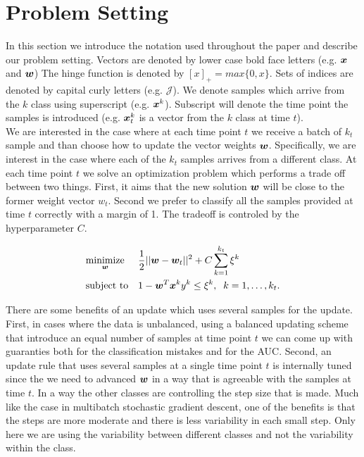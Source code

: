 \section{Problem Setting}

In this section we introduce the notation used throughout the paper and describe our problem setting. Vectors are denoted by lower case bold face letters (e.g. $\bm{x}$ and $\bm{w}$) 
The hinge function is denoted by $[x]_+ = max\{0, x\} $. Sets of indices are denoted by capital curly letters (e.g. $\mathcal{J}$). We denote samples which arrive from the $k$ class using superscript (e.g. $\bm{x}^k$). Subscript will denote the time point the samples is introduced (e.g. $\bm{x}^k_t$ is a vector from the $k$ class at time $t$). \\

We are interested in the case where at each time point $t$ we receive a batch of $k_t$ sample and than choose how to update the vector weights $\bm{w}$. Specifically, we are interest in the case where each of the $k_t$ samples arrives from a different class. At each time point $t$ we solve an optimization problem which performs a trade off between two things. First, it aims that the new solution $\bm{w}$ will be close to the former weight vector $w_t$. Second we prefer to classify all the samples provided at time $t$ correctly with a margin of 1. The tradeoff is controled by the hyperparameter $C$.

\begin{equation*}
\begin{aligned}
& \underset{\bm{w}}{\text{minimize}}
& & \frac{1}{2} || \bm{w} - \bm{w}_t ||^2 + C \sum\limits_{k=1}^{k_t}{\xi^k} \\
& \text{subject to}
& & 1 - \bm{w}^T \bm{x}^k y^k \leq \xi^k, \;
 \; k = 1, \ldots, k_t.
\end{aligned}
\end{equation*}

There are some benefits of an update which uses several samples for the update. First, in cases where the data is unbalanced, using a balanced updating scheme that introduce an equal number of samples at time point $t$ we can come up with guaranties both for the classification mistakes and for the AUC.
Second, an update rule that uses several samples at a single time point $t$ is internally tuned since the we need to advanced $\bm{w}$ in a way that is agreeable with the samples at time $t$. In a way the other classes are controlling the step size that is made. Much like the case in multibatch stochastic gradient descent, one of the benefits is that the steps are more moderate and there is less variability in each small step. Only here we are using the variability between different classes and not the variability within the class.